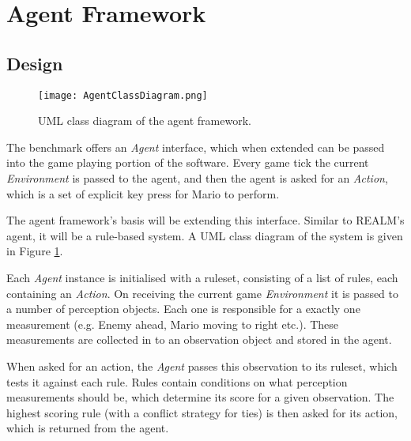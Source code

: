 
\section{Agent Framework}


\subsection{Design}

\begin{figure}[t]
	\centering
	\texttt{[image: AgentClassDiagram.png]}
	\caption{UML class diagram of the agent framework.}
	\label{fig:aumlcd}
\end{figure}

The benchmark offers an \emph{Agent} interface, which when extended can be passed into the game playing portion of the software. Every game tick the current \emph{Environment} is passed to the agent, and then the agent is asked for an \emph{Action}, which is a set of explicit key press for Mario to perform.

The agent framework's basis will be extending this interface. Similar to REALM's agent, it will be a rule-based system. A UML class diagram of the system is given in Figure \ref{fig:aumlcd}.

\vspace{\baselineskip}

Each \emph{Agent} instance is initialised with a ruleset, consisting of a list of rules, each containing an \emph{Action}. On receiving the current game \emph{Environment} it is passed to a number of perception objects. Each one is responsible for a exactly one measurement (e.g. Enemy ahead, Mario moving to right etc.). These measurements are collected in to an observation object and stored in the agent.

When asked for an action, the \emph{Agent} passes this observation to its ruleset, which tests it against each rule. Rules contain conditions on what perception measurements should be, which determine its score for a given observation. The highest scoring rule (with a conflict strategy for ties) is then asked for its action, which is returned from the agent.

